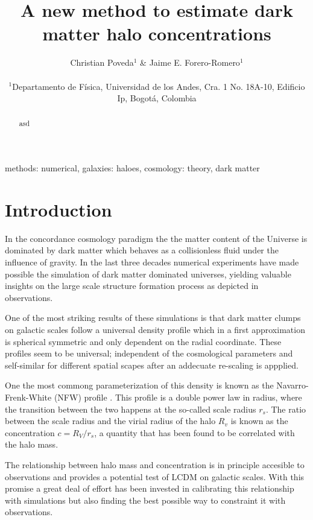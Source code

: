 \documentclass[useAMS,usenatbib]{mn2e}
\begin{document}
\title[A new method for concentrations]{A new method to estimate
  dark matter halo concentrations}
\author[Poveda \& Forero-Romero]{
\parbox[t]{\textwidth}{\raggedright
  Christian Poveda$^{1}$ \&
  Jaime E. Forero-Romero$^{1}$
}
\vspace*{6pt}\\
$^{1}$Departamento de F\'{i}sica, Universidad de los Andes, Cra. 1
No. 18A-10, Edificio Ip, Bogot\'a, Colombia\\
}
\maketitle

\begin{abstract}
asd
\end{abstract}
\begin{keywords}
methods: numerical, galaxies: haloes, cosmology: theory, dark
matter
\end{keywords}


\section{Introduction}
\label{sec:introduction}
In the concordance cosmology paradigm the the matter content of the
Universe is dominated by dark matter which behaves as a collisionless
fluid under the influence of gravity. In the last three decades
numerical experiments have made possible the simulation of dark matter
dominated universes, yielding valuable insights on the large scale
structure formation process as depicted in observations.

One of the most striking results of these simulations is that dark
matter clumps on galactic scales follow a universal density profile
which in a first approximation is spherical symmetric and only
dependent on the radial coordinate. These profiles seem to be
universal; independent of the cosmological parameters and self-similar
for different spatial scapes after an addecuate re-scaling is
appplied.

One the most commong parameterization of this density is known as the
Navarro-Frenk-White (NFW) profile \citep{NFW}. This profile is a
double power law in radius, where the transition between the two
happens at the so-called scale radius $r_s$. The ratio between the
scale radius and the virial radius of the halo $R_v$ is known as the
concentration $c=R_V/r_s$, a quantity that has been found to be
correlated with the halo mass.

The relationship between halo mass and concentration is in principle
accesible to observations and provides a potential test of LCDM on
galactic scales. With this promise a great deal of effort has been
invested in calibrating this relationship with simulations but also
finding the best possible way to constraint it with observations.
\end{document}
